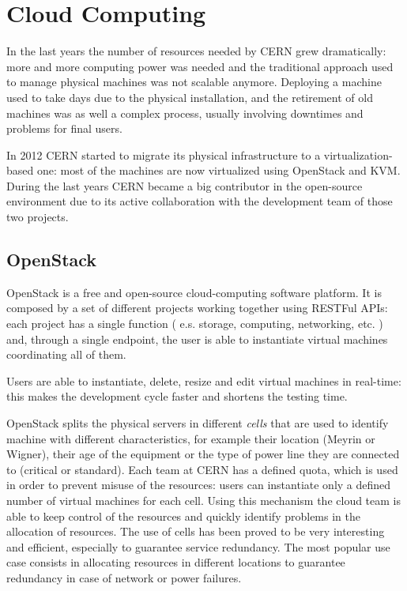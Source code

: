 \section{Cloud Computing}

In the last years the number of resources needed by CERN grew
dramatically: more and more computing power was needed and the traditional
approach used to manage physical machines was not scalable anymore.
Deploying a machine used to take days due to the physical installation,
and the retirement of old machines was as well a complex process, usually
involving downtimes and problems for final users.

In 2012 CERN started to migrate its physical infrastructure to
a virtualization-based one: most of the machines are now virtualized using
OpenStack and KVM. During the last years CERN became a big contributor in
the open-source environment due to its active collaboration with the
development team of those two projects.

\subsection{OpenStack}

OpenStack \cite{OpenStackWebsite} is a free and open-source
cloud-computing software platform. It is composed by a set of different
projects working together using RESTFul APIs: each project has a single
function ( e.s. storage, computing, networking, etc. ) and, through
a single endpoint, the user is able to instantiate virtual machines
coordinating all of them.

Users are able to instantiate, delete, resize and edit virtual machines in
real-time: this makes the development cycle faster and shortens the
testing time.

OpenStack splits the physical servers in different \textit{cells} that are
used to identify machine with different characteristics, for example their
location (Meyrin or Wigner), their age of the equipment or the type of
power line they are connected to (critical or standard). Each team at CERN
has a defined quota, which is used in order to prevent misuse of the
resources: users can instantiate only a defined number of virtual machines
for each cell. Using this mechanism the cloud team is able to keep control
of the resources and quickly identify problems in the allocation of
resources. The use of cells has been proved to be very interesting and
efficient, especially to guarantee service redundancy. The most popular
use case consists in allocating resources in different locations to
guarantee redundancy in case of network or power failures.

